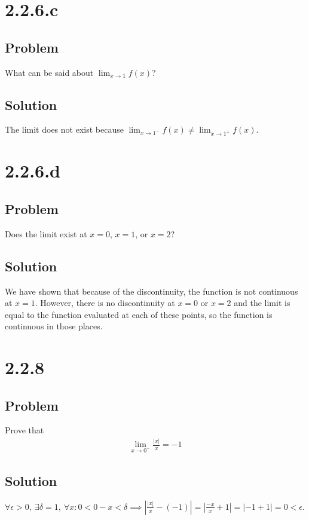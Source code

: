 \documentclass[12pt]{article}
\newcommand{\abs}  [1]{\left|       #1 \right|      }
\begin{document}
\section*{2.2.6.c}

\subsection*{Problem}
What can be said about $\lim_{x \to 1} f(x)$?

\subsection*{Solution}
The limit does not exist because $\lim_{x \to 1^-} f(x) \neq \lim_{x \to 1^+} f(x)$.



\section{2.2.6.d}

\subsection*{Problem}
Does the limit exist at $x = 0$, $x = 1$, or $x = 2$?

\subsection*{Solution}
We have shown that because of the discontinuity, the function is not continuous at $x = 1$. However, there is no discontinuity at $x = 0$ or $x = 2$ and the limit is equal to the function evaluated at each of these points, so the function is continuous in those places.



\section*{2.2.8}

\subsection*{Problem}
Prove that
\begin{align*}
    \lim_{x \to 0^-} \frac{\abs{x}}{x} = -1
\end{align*}

\subsection*{Solution}
$\forall \epsilon > 0,\ \exists \delta = 1,\ \forall x : 0 < 0 - x < \delta \implies \abs{\frac{\abs{x}}{x} - (-1)} = \abs{\frac{-x}{x} + 1} = \abs{-1 + 1} = 0 < \epsilon$.
\end{document}
